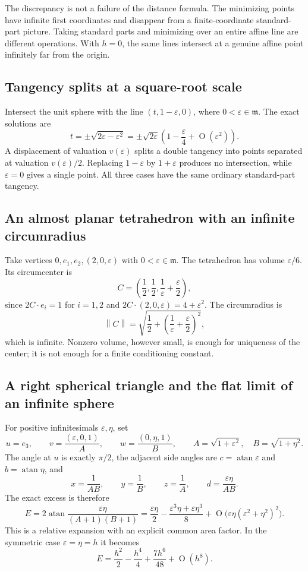 \documentclass[11pt,letterpaper]{article}
\numberwithin{equation}{section}
\theoremstyle{definition}
\theoremstyle{remark}
\newcommand{\mm}{\mathfrak m}
\newcommand{\eps}{\varepsilon}
\newcommand{\atan}{\operatorname{atan}}
\newcommand{\norm}[1]{\left\lVert#1\right\rVert}
\newcommand{\smallO}{\operatorname{O}}
\begin{document}
The discrepancy is not a failure of the distance formula. The minimizing
points have infinite first coordinates and disappear from a finite-coordinate
standard-part picture. Taking standard parts and minimizing over an entire
affine line are different operations. With $h=0$, the same lines intersect
at a genuine affine point infinitely far from the origin.

\subsection{Tangency splits at a square-root scale}

Intersect the unit sphere with the line $(t,1-\eps,0)$, where
$0<\eps\in\mm$. The exact solutions are
\[
 t=\pm\sqrt{2\eps-\eps^2}
 =\pm\sqrt{2\eps}\left(1-\frac\eps4+\smallO(\eps^2)\right).
\]
A displacement of valuation $v(\eps)$ splits a double tangency into
points separated at valuation $v(\eps)/2$. Replacing $1-\eps$ by
$1+\eps$ produces no intersection, while $\eps=0$ gives a single
point. All three cases have the same ordinary standard-part tangency.

\subsection{An almost planar tetrahedron with an infinite circumradius}

Take vertices $0,e_1,e_2,(2,0,\eps)$ with $0<\eps\in\mm$.
The tetrahedron has volume $\eps/6$. Its circumcenter is
\[
 C=\left(\frac12,\frac12,\frac1\eps+\frac\eps2\right),
\]
since $2C\cdot e_i=1$ for $i=1,2$ and
$2C\cdot(2,0,\eps)=4+\eps^2$. The circumradius is
\[
 \norm C=\sqrt{\frac12+\left(\frac1\eps+\frac\eps2\right)^2},
\]
which is infinite. Nonzero volume, however small, is enough for uniqueness
of the center; it is not enough for a finite conditioning constant.

\subsection{A right spherical triangle and the flat limit of an infinite sphere}

For positive infinitesimals $\eps,\eta$, set
\[
 u=e_3,\qquad
 v=\frac{(\eps,0,1)}{A},\qquad
 w=\frac{(0,\eta,1)}{B},\qquad
 A=\sqrt{1+\eps^2},\quad B=\sqrt{1+\eta^2}.
\]
The angle at $u$ is exactly $\pi/2$, the adjacent side angles are
$c=\atan\eps$ and $b=\atan\eta$, and
\[
 x=\frac1{AB},\qquad y=\frac1B,\qquad z=\frac1A,
 \qquad d=\frac{\eps\eta}{AB}.
\]
The exact excess is therefore
\begin{equation}\label{e3:eq:right-small-excess}
 E=2\atan\frac{\eps\eta}{(A+1)(B+1)}
 =\frac{\eps\eta}{2}-\frac{\eps^3\eta+\eps\eta^3}{8}
 +\smallO\bigl(\eps\eta(\eps^2+\eta^2)^2\bigr).
\end{equation}
This is a relative expansion with an explicit common area factor.
In the symmetric case $\eps=\eta=h$ it becomes
\begin{equation}\label{e3:eq:symmetric-area}
 E=\frac{h^2}{2}-\frac{h^4}{4}+\frac{7h^6}{48}+\smallO(h^8).
\end{equation}
\end{document}
